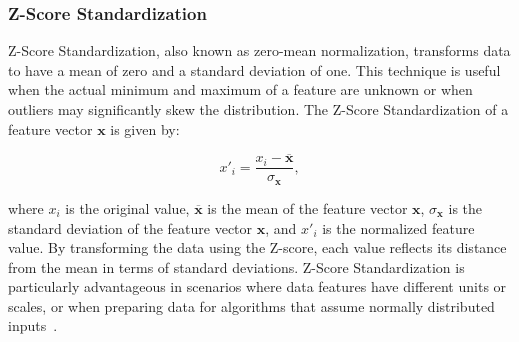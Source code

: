\subsubsection{Z-Score Standardization}
Z-Score Standardization, also known as zero-mean normalization, transforms data to have a mean of zero and a standard deviation of one.
This technique is useful when the actual minimum and maximum of a feature are unknown or when outliers may significantly skew the distribution.
The Z-Score Standardization of a feature vector \(\mathbf{x}\) is given by:

$$
x'_i = \frac{x_i - \overline{\mathbf{x}}}{\sigma_\mathbf{x}},
$$

where \(x_i\) is the original value, \(\overline{\mathbf{x}}\) is the mean of the feature vector \(\mathbf{x}\), \(\sigma_\mathbf{x}\) is the standard deviation of the feature vector \(\mathbf{x}\), and \(x'_i\) is the normalized feature value.
By transforming the data using the Z-score, each value reflects its distance from the mean in terms of standard deviations.
Z-Score Standardization is particularly advantageous in scenarios where data features have different units or scales, or when preparing data for algorithms that assume normally distributed inputs~\cite{dataminingConcepts}.
